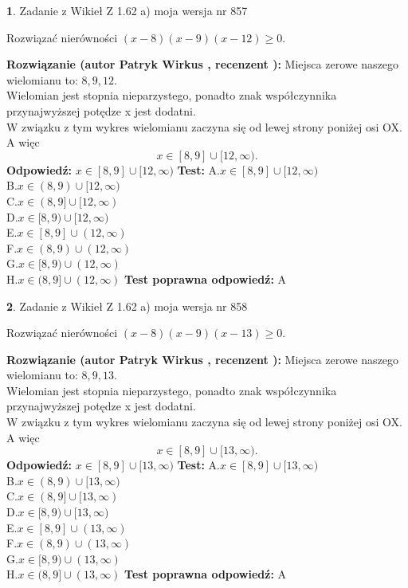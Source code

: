 \documentclass[12pt, a4paper]{article}
\theoremstyle{definition} %
\newtheorem{zad}{}
\newcommand{\zadStart}[1]{\begin{zad}#1\newline}
\newcommand{\zadStop}{\end{zad}}
\newcommand{\rozwStart}[2]{\noindent \textbf{Rozwiązanie (autor #1 , recenzent #2): }\newline}
\newcommand{\rozwStop}{\newline}
\newcommand{\odpStart}{\noindent \textbf{Odpowiedź:}\newline}
\newcommand{\odpStop}{\newline}
\newcommand{\testStart}{\noindent \textbf{Test:}\newline}
\newcommand{\testStop}{\newline}
\newcommand{\kluczStart}{\noindent \textbf{Test poprawna odpowiedź:}\newline}
\newcommand{\kluczStop}{\newline}
\begin{document}
\zadStart{Zadanie z Wikieł Z 1.62 a) moja wersja nr 857}

Rozwiązać nierówności $(x-8)(x-9)(x-12)\ge0$.
\zadStop
\rozwStart{Patryk Wirkus}{}
Miejsca zerowe naszego wielomianu to: $8, 9, 12$.\\
Wielomian jest stopnia nieparzystego, ponadto znak współczynnika przy\linebreak najwyższej potędze x jest dodatni.\\ W związku z tym wykres wielomianu zaczyna się od lewej strony poniżej osi OX. A więc $$x \in [8,9] \cup [12,\infty).$$
\rozwStop
\odpStart
$x \in [8,9] \cup [12,\infty)$
\odpStop
\testStart
A.$x \in [8,9] \cup [12,\infty)$\\
B.$x \in (8,9) \cup [12,\infty)$\\
C.$x \in (8,9] \cup [12,\infty)$\\
D.$x \in [8,9) \cup [12,\infty)$\\
E.$x \in [8,9] \cup (12,\infty)$\\
F.$x \in (8,9) \cup (12,\infty)$\\
G.$x \in [8,9) \cup (12,\infty)$\\
H.$x \in (8,9] \cup (12,\infty)$
\testStop
\kluczStart
A
\kluczStop



\zadStart{Zadanie z Wikieł Z 1.62 a) moja wersja nr 858}

Rozwiązać nierówności $(x-8)(x-9)(x-13)\ge0$.
\zadStop
\rozwStart{Patryk Wirkus}{}
Miejsca zerowe naszego wielomianu to: $8, 9, 13$.\\
Wielomian jest stopnia nieparzystego, ponadto znak współczynnika przy\linebreak najwyższej potędze x jest dodatni.\\ W związku z tym wykres wielomianu zaczyna się od lewej strony poniżej osi OX. A więc $$x \in [8,9] \cup [13,\infty).$$
\rozwStop
\odpStart
$x \in [8,9] \cup [13,\infty)$
\odpStop
\testStart
A.$x \in [8,9] \cup [13,\infty)$\\
B.$x \in (8,9) \cup [13,\infty)$\\
C.$x \in (8,9] \cup [13,\infty)$\\
D.$x \in [8,9) \cup [13,\infty)$\\
E.$x \in [8,9] \cup (13,\infty)$\\
F.$x \in (8,9) \cup (13,\infty)$\\
G.$x \in [8,9) \cup (13,\infty)$\\
H.$x \in (8,9] \cup (13,\infty)$
\testStop
\kluczStart
A
\kluczStop
\end{document}
